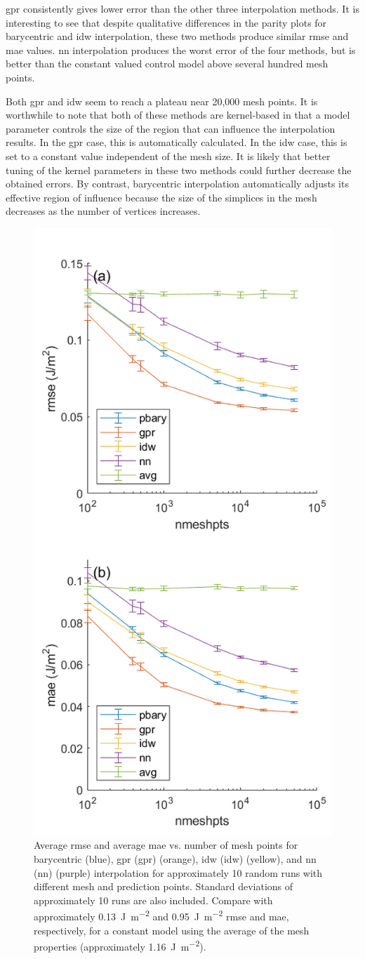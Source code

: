 \documentclass[preprint,12pt]{elsarticle}
\begin{document}
\Gls{gpr} consistently gives lower error than the other three interpolation methods. It is interesting to see that despite qualitative differences in the parity plots for barycentric and \gls{idw} interpolation, these two methods produce similar \gls{rmse} and \gls{mae} values. \Gls{nn} interpolation produces the worst error of the four methods, but is better than the constant valued control model above several hundred mesh points. 

Both \gls{gpr} and \gls{idw} seem to reach a plateau near 20,000 mesh points. It is worthwhile to note that both of these methods are kernel-based in that a model parameter controls the size of the region that can influence the interpolation results. In the \gls{gpr} case, this is automatically calculated. In the \gls{idw} case, this is set to a constant value independent of the mesh size. It is likely that better tuning of the kernel parameters in these two methods could further decrease the obtained errors. By contrast, barycentric interpolation automatically adjusts its effective region of influence because the size of the simplices in the mesh decreases as the number of vertices increases.
\begin{figure}
    \centering
    \includegraphics[width=0.5\linewidth]{brkerror.png}
    \caption{Average \acrlong{rmse} and average \acrlong{mae} vs. number of mesh points for barycentric (blue), \acrlong{gpr} (\acrshort{gpr}) (orange), \acrlong{idw} (\acrshort{idw}) (yellow), and \acrlong{nn} (\acrshort{nn}) (purple) interpolation for approximately 10 random runs with different mesh and prediction points. Standard deviations of approximately 10 runs are also included. Compare with approximately \SI{0.13}{\J\per\square\meter} and \SI{0.95}{\J\per\square\meter} \acrshort{rmse} and \acrshort{mae}, respectively, for a constant model using the average of the mesh properties (approximately \SI{1.16}{\J\per\square\meter}).}
    \label{fig:brkerror}
\end{figure}
\end{document}
